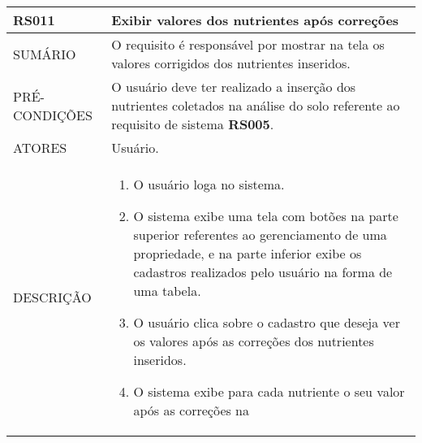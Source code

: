 \begin{longtable}[c]{@{}|p{4cm}|p{9cm}|@{}}
\hline
\begin{minipage}[t]{0.47\columnwidth}
\textbf{RS011}
\end{minipage} & \begin{minipage}[t]{0.47\columnwidth}
Exibir valores dos nutrientes após correções
\end{minipage}
\\\hline
\begin{minipage}[t]{0.47\columnwidth}
SUMÁRIO
\end{minipage} & \begin{minipage}[t]{0.47\columnwidth}
O requisito é responsável por mostrar na tela os valores corrigidos dos
nutrientes inseridos.
\end{minipage}
\\\hline
\begin{minipage}[t]{0.47\columnwidth}
PRÉ-CONDIÇÕES
\end{minipage} & \begin{minipage}[t]{0.47\columnwidth}
O usuário deve ter realizado a inserção dos nutrientes coletados na
análise do solo referente ao requisito de sistema \textbf{RS005}.
\end{minipage}
\\\hline
\begin{minipage}[t]{0.47\columnwidth}
ATORES
\end{minipage} & \begin{minipage}[t]{0.47\columnwidth}
Usuário.
\end{minipage}
\\\hline
\begin{minipage}[t]{0.47\columnwidth}
DESCRIÇÃO
\end{minipage} & \begin{minipage}[t]{0.47\columnwidth}
\begin{enumerate}
\def\labelenumi{\arabic{enumi}.}
\itemsep1pt\parskip0pt\parsep0pt
\item
  O usuário loga no sistema.
\item
  O sistema exibe uma tela com botões na parte superior referentes ao
  gerenciamento de uma propriedade, e na parte inferior exibe os
  cadastros realizados pelo usuário na forma de uma tabela.
\item
  O usuário clica sobre o cadastro que deseja ver os valores após as
  correções dos nutrientes inseridos.
\item
  O sistema exibe para cada nutriente o seu valor após as correções na

\end{enumerate}
\end{minipage}
\end{longtable}
